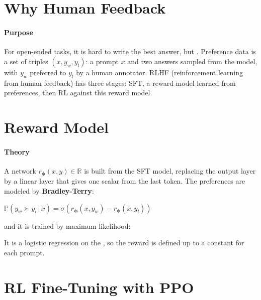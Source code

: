 \section{Why Human Feedback}
\paragraph{Purpose}
For open-ended tasks, it is hard to write the best answer, but . Preference data is a set of triples $(x,y_{w},y_{l})$: a prompt $x$ and
two answers sampled from the model, with $y_{w}$ preferred to $y_{l}$ by a human annotator.
RLHF (reinforcement learning from human feedback) has three stages: SFT, a reward model
learned from preferences, then RL against this reward model.

\section{Reward Model}
\paragraph{Theory}
A network $r_{\bm{\phi}}(x,y)\in\mathbb{R}$ is built from the SFT model, replacing the output
layer by a linear layer that gives one scalar from the last token. The preferences are
modeled by \textbf{Bradley-Terry}:
\begin{center}
    $\mathbb{P}\left(y_{w}\succ y_{l}\,|\,x\right)=\sigma\left(r_{\bm{\phi}}(x,y_{w})-
    r_{\bm{\phi}}(x,y_{l})\right)$
\end{center}
and it is trained by maximum likelihood:
\begin{center}
\end{center}
It is a logistic regression on the , so the reward is defined
up to a constant for each prompt.

\section{RL Fine-Tuning with PPO}
